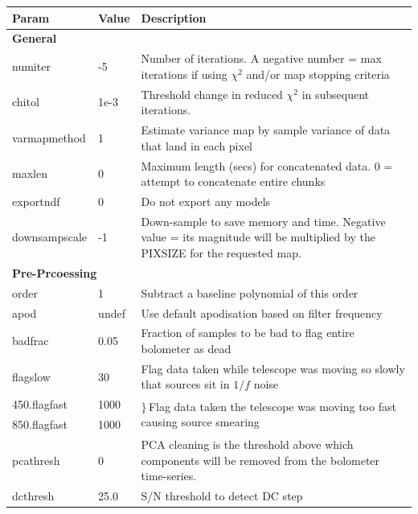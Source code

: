 \documentclass[twoside,11pt]{article}
\renewcommand{\_}{\texttt{\symbol{95}}}
\begin{document}
\begin{table}
\begin{center}
\begin{footnotesize}
\begin{tabular}{|p{2.2cm}|p{1.1cm}|p{11.4cm}|}
\hline
Param & Value & Description \\
\hline
\multicolumn{3}{|l|}{\textbf{General}}\\
\hline
numiter       &   -5 & Number of iterations. A negative number = max iterations
                       if using $\chi^2$ and/or map stopping criteria\\
chitol        & 1e-3 & Threshold change in reduced $\chi^2$ in subsequent
                       iterations.\\
varmapmethod  &    1 & Estimate variance map by sample variance of data that
                       land in each pixel\\
maxlen        &    0 & Maximum length (secs) for concatenated data. 0 = attempt
                       to concatenate entire chunks\\
exportndf     &    0 & Do not export any models\\
downsampscale &   -1 & Down-sample to save memory and time. Negative value = its
                       magnitude will be multiplied by the PIXSIZE for the
                       requested map.\\
\hline
\multicolumn{3}{|l|}{\textbf{Pre-Prcoessing}}\\
\hline
order         &    1  & Subtract a baseline polynomial of this order\\
apod          & undef & Use default apodisation based on filter frequency\\
badfrac       & 0.05  & Fraction of samples to be bad to flag entire bolometer
                        as dead\\
flagslow      &    30 & Flag data taken while telescope was moving so slowly
                        that sources sit in $1/f$ noise\\
450.flagfast  &  1000 & \multirow{2}{*}{{\large$\rbrace$}\,Flag data taken
                        the telescope was moving too fast causing source
                        smearing}\\
850.flagfast  &  1000 & \\
pcathresh     &     0 & PCA cleaning is the threshold above which components
                        will be removed from the bolometer time-series.\\
dcthresh      &  25.0 & S/N threshold to detect DC step\\

\end{tabular}
\end{footnotesize}
\end{center}
\end{table}
\end{document}
